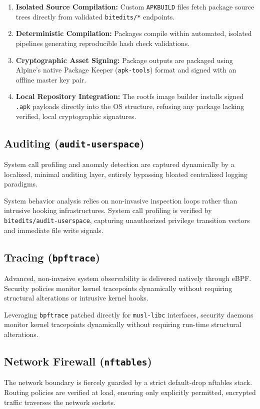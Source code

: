 \documentclass{article}
\begin{document}
\begin{enumerate}
\item \textbf{Isolated Source Compilation:} Custom \texttt{APKBUILD} files fetch package source trees directly from validated \texttt{bitedits/*} endpoints.
\item \textbf{Deterministic Compilation:} Packages compile within automated, isolated pipelines generating reproducible hash check validations.
\item \textbf{Cryptographic Asset Signing:} Package outputs are packaged using Alpine's native Package Keeper (\texttt{apk-tools}) format and
      signed with an offline master key pair.
\item \textbf{Local Repository Integration:} The rootfs image builder installs signed \texttt{.apk}
      payloads directly into the OS structure, refusing any package lacking verified, local cryptographic signatures.
\end{enumerate}

\subsection{Auditing (\texttt{audit-userspace})}
System call profiling and anomaly detection are captured dynamically by a localized, minimal auditing layer, entirely bypassing bloated centralized logging paradigms.

System behavior analysis relies on non-invasive inspection loops rather than intrusive hooking infrastructures. System call profiling is verified by \texttt{bitedits/audit-userspace}, capturing unauthorized privilege transition vectors and immediate file write signals.

\subsection{Tracing (\texttt{bpftrace})}
Advanced, non-invasive system observability is delivered natively through eBPF. Security policies monitor kernel tracepoints dynamically without requiring structural alterations or intrusive kernel hooks.

Leveraging \texttt{bpftrace} patched directly for \texttt{musl-libc} interfaces, security daemons monitor kernel tracepoints dynamically without requiring run-time structural alterations.

\subsection{Network Firewall (\texttt{nftables})}
The network boundary is fiercely guarded by a strict default-drop nftables stack. Routing policies are verified at load, ensuring only explicitly permitted, encrypted traffic traverses the network sockets.
\end{document}
